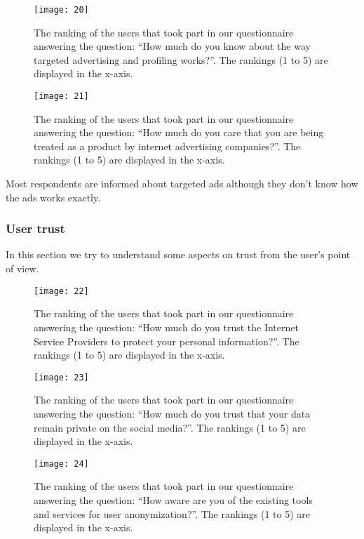 \begin{figure}[H]
\centering
\texttt{[image: 20]}
\caption{The ranking of the users that took part in our questionnaire answering
the question: ``How much do you know about the way targeted advertising and 
profiling works?''. The rankings (1 to 5) are displayed in the x-axis.}
\end{figure}

\begin{figure}[H]
\centering
\texttt{[image: 21]}
\caption{The ranking of the users that took part in our questionnaire answering
the question: ``How much do you care that you are being treated as a product by 
internet advertising companies?''. The rankings (1 to 5) are displayed in the 
x-axis.}
\end{figure}

Most respondents are informed about targeted ads although they don't know how 
the ads works exactly.

\subsubsection{User trust}

In this section we try to understand some aspects on trust from the user's point 
of view.

\begin{figure}[H]
\centering
\texttt{[image: 22]}
\caption{The ranking of the users that took part in our questionnaire answering
the question: ``How much do you trust the Internet Service Providers to protect 
your personal information?''. The rankings (1 to 5) are displayed in the x-axis.}
\end{figure}

\begin{figure}[H]
\centering
\texttt{[image: 23]}
\caption{The ranking of the users that took part in our questionnaire answering
the question: ``How much do you trust that your data remain private on the 
social media?''. The rankings (1 to 5) are displayed in the x-axis.}
\end{figure}

\begin{figure}[H]
\centering
\texttt{[image: 24]}
\caption{The ranking of the users that took part in our questionnaire answering
the question: ``How aware are you of the existing tools and services for user 
anonymization?''. The rankings (1 to 5) are displayed in the x-axis.}
\end{figure}

